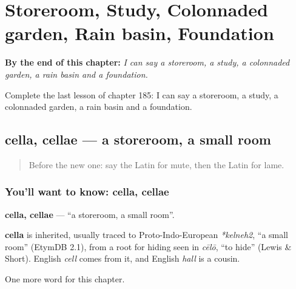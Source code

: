 
\chapter{Storeroom, Study, Colonnaded garden, Rain basin, Foundation}
\label{ch:la-storeroom-study-colonnaded-garden-rain-basin-foundation}

\begin{chapteropening}
\textbf{By the end of this chapter:} \emph{I can say a storeroom, a study, a colonnaded garden, a rain basin and a foundation.}

Complete the last lesson of chapter 185: I can say a storeroom, a study, a colonnaded garden, a rain basin and a foundation.
\end{chapteropening}

\section[cella, cellae]{cella, cellae — a storeroom, a small room}

\label{lesson:LA-C185-cella}



\begin{quote}
Before the new one: say the Latin for mute, then the Latin for lame.
\end{quote}

\subsection*{You'll want to know: cella, cellae}
\textbf{cella, cellae} — \textquotedblleft{}a storeroom, a small room\textquotedblright{}.

\begin{cousinweb}
\textbf{cella} is inherited, usually traced to Proto-Indo-European \emph{*kelneh2}, \textquotedblleft{}a small room\textquotedblright{} (EtymDB 2.1), from a root for hiding seen in \emph{cēlō}, \textquotedblleft{}to hide\textquotedblright{} (Lewis \& Short). English \emph{cell} comes from it, and English \emph{hall} is a cousin.
\end{cousinweb}

\begin{grammarlens}[title={What you've built}]
One more word for this chapter.
\end{grammarlens}

